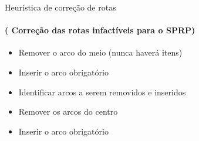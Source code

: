 \documentclass[12pt]{beamer}
\begin{document}
\begin{frame}{Heur\'istica de corre\c{c}\~ao de rotas}
	\framesubtitle{( Corre\c{c}\~ao das rotas infact\'iveis para o SPRP)}
	\fboxsep=0pt
	\hfill%
	{%
		\begin{minipage}[t]{0.4\linewidth}
			\begin{itemize}
				\item Remover o arco do meio (nunca haver\'a itens)
				\pause
				\item Inserir o arco obrigat\'orio
				\pause
				\item Identificar arcos a serem removidos e inseridos
				\pause
				\item Remover os arcos do centro
				\pause
				\item Inserir o arco obrigat\'orio
			\end{itemize}
		\end{minipage}
	}
\end{frame}


\end{document}
